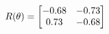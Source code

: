 \documentclass[preview]{standalone}
\begin{document}
\begin{align*}
\special{dvisvgm:raw <g id='unique000'>}R(\theta) = \begin{bmatrix}-0.68 & -0.73\\0.73 & -0.68\end{bmatrix}\special{dvisvgm:raw </g>}
\end{align*}
\end{document}
